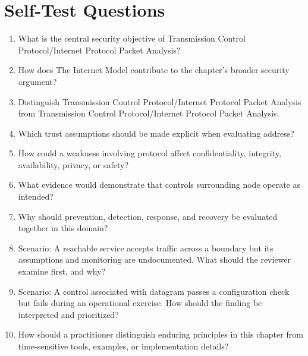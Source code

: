 \documentclass[11pt]{article}
\begin{document}
\section*{Self-Test Questions}
\begin{enumerate}
\item What is the central security objective of Transmission Control Protocol/Internet Protocol Packet Analysis?
\item How does The Internet Model contribute to the chapter's broader security argument?
\item Distinguish Transmission Control Protocol/Internet Protocol Packet Analysis from Transmission Control Protocol/Internet Protocol Packet Analysis.
\item Which trust assumptions should be made explicit when evaluating address?
\item How could a weakness involving protocol affect confidentiality, integrity, availability, privacy, or safety?
\item What evidence would demonstrate that controls surrounding node operate as intended?
\item Why should prevention, detection, response, and recovery be evaluated together in this domain?
\item Scenario: A reachable service accepts traffic across a boundary but its assumptions and monitoring are undocumented. What should the reviewer examine first, and why?
\item Scenario: A control associated with datagram passes a configuration check but fails during an operational exercise. How should the finding be interpreted and prioritized?
\item How should a practitioner distinguish enduring principles in this chapter from time-sensitive tools, examples, or implementation details?
\end{enumerate}
\end{document}
